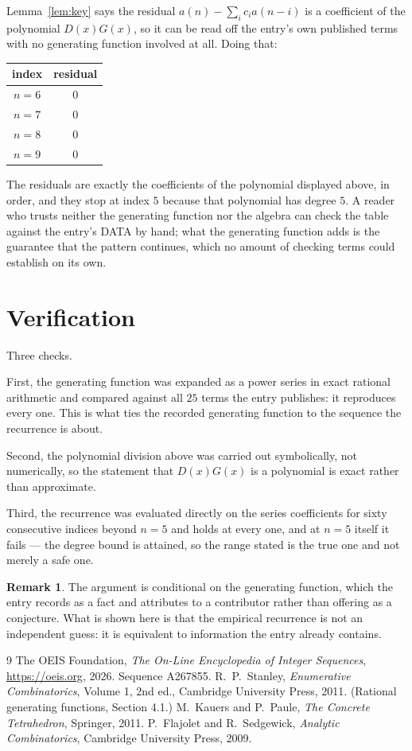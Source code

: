 \documentclass[11pt,a4paper]{article}
\theoremstyle{plain}
\theoremstyle{definition}
\newtheorem{remark}[theorem]{Remark}
\begin{document}
Lemma~\ref{lem:key} says the residual $a(n)-\sum_ic_ia(n-i)$ is a coefficient of the
polynomial $D(x)G(x)$, so it can be read off the entry's own published terms with no
generating function involved at all. Doing that:
\begin{center}
\begin{tabular}{cc}
index & residual \\ \hline
$n=6$ & $0$ \\
$n=7$ & $0$ \\
$n=8$ & $0$ \\
$n=9$ & $0$
\end{tabular}
\end{center}
The residuals are exactly the coefficients of the polynomial displayed above, in order, and
they stop at index $5$ because that polynomial has degree $5$. A reader who trusts
neither the generating function nor the algebra can check the table against the entry's DATA
by hand; what the generating function adds is the guarantee that the pattern continues, which
no amount of checking terms could establish on its own.

\section{Verification}

Three checks.

First, the generating function was expanded as a power series in exact rational arithmetic and
compared against all $25$ terms the entry publishes: it reproduces every one. This is
what ties the recorded generating function to the sequence the recurrence is about.

Second, the polynomial division above was carried out symbolically, not numerically, so the
statement that $D(x)G(x)$ is a polynomial is exact rather than approximate.

Third, the recurrence was evaluated directly on the series coefficients for sixty consecutive
indices beyond $n=5$ and holds at every one, and at $n=5$ itself it fails --- the
degree bound is attained, so the range stated is the true one and not merely a safe one.

\begin{remark}
The argument is conditional on the generating function, which the entry records as a fact and
attributes to a contributor rather than offering as a conjecture. What is shown here is that
the empirical recurrence is not an independent guess: it is equivalent to information the
entry already contains.
\end{remark}

\begin{thebibliography}{9}
 The OEIS Foundation, \emph{The On-Line Encyclopedia of Integer
Sequences}, \url{https://oeis.org}, 2026. Sequence A267855.
 R.~P.~Stanley, \emph{Enumerative Combinatorics}, Volume 1, 2nd ed.,
Cambridge University Press, 2011. (Rational generating functions, Section 4.1.)
 M.~Kauers and P.~Paule, \emph{The Concrete Tetrahedron}, Springer, 2011.
 P.~Flajolet and R.~Sedgewick, \emph{Analytic Combinatorics}, Cambridge
University Press, 2009.
\end{thebibliography}
\end{document}
